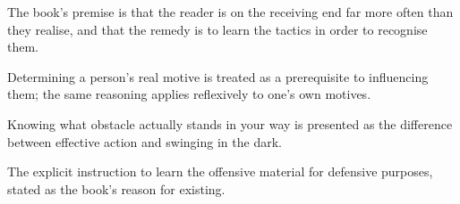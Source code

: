 

\begin{distilled}
  \item The book's premise is that the reader is on the receiving end far more often than they realise, and that the remedy is to learn the tactics in order to recognise them.
  \item Determining a person's real motive is treated as a prerequisite to influencing them; the same reasoning applies reflexively to one's own motives.
  \item Knowing what obstacle actually stands in your way is presented as the difference between effective action and swinging in the dark.
\end{distilled}

\begin{unique}
  \item The explicit instruction to learn the offensive material for defensive purposes, stated as the book's reason for existing.
\end{unique}
